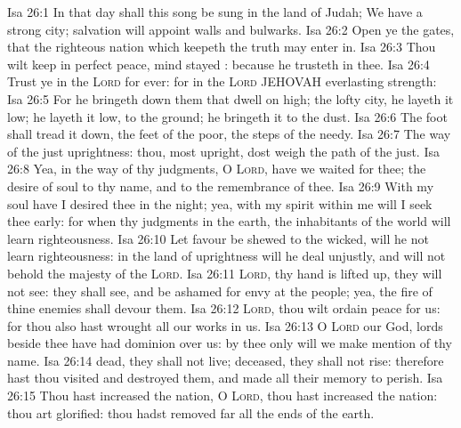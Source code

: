 \vs Isa 26:1 In that day shall this song be sung in the land of Judah; We have a strong city; salvation will  appoint  walls and bulwarks.
\vs Isa 26:2 Open ye the gates, that the righteous nation which keepeth the truth may enter in.
\vs Isa 26:3 Thou wilt keep  in perfect peace,  mind  stayed : because he trusteth in thee.
\vs Isa 26:4 Trust ye in the \textsc{Lord} for ever: for in the \textsc{Lord} JEHOVAH  everlasting strength:
\vs Isa 26:5 For he bringeth down them that dwell on high; the lofty city, he layeth it low; he layeth it low,  to the ground; he bringeth it  to the dust.
\vs Isa 26:6 The foot shall tread it down,  the feet of the poor,  the steps of the needy.
\vs Isa 26:7 The way of the just  uprightness: thou, most upright, dost weigh the path of the just.
\vs Isa 26:8 Yea, in the way of thy judgments, O \textsc{Lord}, have we waited for thee; the desire of  soul  to thy name, and to the remembrance of thee.
\vs Isa 26:9 With my soul have I desired thee in the night; yea, with my spirit within me will I seek thee early: for when thy judgments  in the earth, the inhabitants of the world will learn righteousness.
\vs Isa 26:10 Let favour be shewed to the wicked,  will he not learn righteousness: in the land of uprightness will he deal unjustly, and will not behold the majesty of the \textsc{Lord}.
\vs Isa 26:11 \textsc{Lord},  thy hand is lifted up, they will not see:  they shall see, and be ashamed for  envy at the people; yea, the fire of thine enemies shall devour them.
\vs Isa 26:12 \textsc{Lord}, thou wilt ordain peace for us: for thou also hast wrought all our works in us.
\vs Isa 26:13 O \textsc{Lord} our God,  lords beside thee have had dominion over us:  by thee only will we make mention of thy name.
\vs Isa 26:14  dead, they shall not live;  deceased, they shall not rise: therefore hast thou visited and destroyed them, and made all their memory to perish.
\vs Isa 26:15 Thou hast increased the nation, O \textsc{Lord}, thou hast increased the nation: thou art glorified: thou hadst removed  far  all the ends of the earth.
